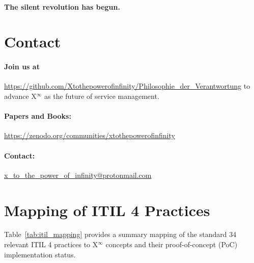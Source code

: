 \documentclass[12pt, a4paper]{scrartcl}
\newcommand{\Xinf}{X$^\infty$}                        %
\begin{document}
\paragraph*{The silent revolution has begun.} 

\section{Contact}
\paragraph*{Join us at} \url{https://github.com/Xtothepowerofinfinity/Philosophie_der_Verantwortung} to advance \Xinf{} as the future of service management.

\paragraph*{Papers and Books:}\url{https://zenodo.org/communities/xtothepowerofinfinity}
\paragraph*{Contact:}\url{x_to_the_power_of_infinity@protonmail.com}
\appendix
\section{Mapping of ITIL 4 Practices}\label{app:mapping}

Table~\ref{tab:itil_mapping} provides a summary mapping of the standard 34 relevant ITIL 4 practices to \Xinf{} concepts and their proof-of-concept (PoC) implementation status.
\end{document}
